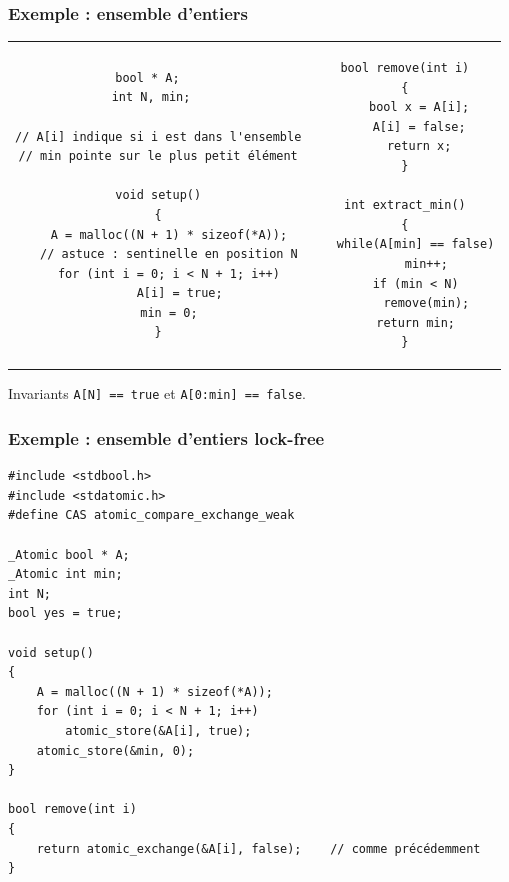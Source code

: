 \documentclass[xcolor={x11names,svgnames}]{beamer}
\begin{document}
\begin{frame}[fragile,label=seq_intset]
  \frametitle{Exemple : ensemble d'entiers}

  \begin{tabular}{c|c}
\begin{minipage}[t]{0.55\textwidth}
\begin{verbatim}
bool * A;   
int N, min;  

// A[i] indique si i est dans l'ensemble
// min pointe sur le plus petit élément

void setup()
{
   A = malloc((N + 1) * sizeof(*A));
   // astuce : sentinelle en position N
   for (int i = 0; i < N + 1; i++)
      A[i] = true;
   min = 0;
}
\end{verbatim}
\end{minipage}
  &
\begin{minipage}[t]{0.45\textwidth}
\begin{verbatim}
bool remove(int i)
{
    bool x = A[i];
    A[i] = false;
    return x;
}

int extract_min()
{
   while(A[min] == false)
      min++;
   if (min < N)
      remove(min);
   return min;
}
\end{verbatim}
\end{minipage}
  \end{tabular}

\begin{alertblock}{Invariants}
  \texttt{A[N] == true} et \texttt{A[0:min] == false}.
\end{alertblock}
\end{frame}


\begin{frame}[fragile,label=lf_intset]
  \frametitle{Exemple : ensemble d'entiers \alert{lock-free}}
  
\begin{verbatim}
#include <stdbool.h>
#include <stdatomic.h>
#define CAS atomic_compare_exchange_weak

_Atomic bool * A;         
_Atomic int min;          
int N;
bool yes = true;

void setup()
{
    A = malloc((N + 1) * sizeof(*A));
    for (int i = 0; i < N + 1; i++)
        atomic_store(&A[i], true);
    atomic_store(&min, 0);
}

bool remove(int i)
{
    return atomic_exchange(&A[i], false);    // comme précédemment
}
\end{verbatim}
\end{frame}
\end{document}
